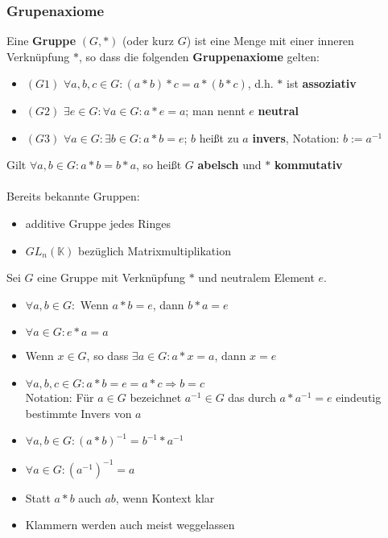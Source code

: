 \documentclass[titlepage]{article}
\newcommand{\K}{\mathbb{K}}
\newcommand{\1}{\mathbb{1}}
\newcommand{\0}{\mathbb{0}}
\begin{document}
				\subsubsection{Grupenaxiome}
					Eine \textbf{Gruppe} $(G,*)$ (oder kurz $G$) ist eine Menge mit einer inneren Verknüpfung $*$, so dass die folgenden \textbf{Gruppenaxiome} gelten:
					\begin{itemize}
						\item $(G1)$ $\forall a,b,c\in G:(a*b)*c=a*(b*c)$, d.h. $*$ ist \textbf{assoziativ}
						\item $(G2)$ $\exists e\in G:\forall a\in G:a*e=a$; man nennt $e$ \textbf{neutral}
						\item $(G3)$ $\forall a\in G:\exists b\in G:a*b=e$; $b$ heißt zu $a$ \textbf{invers}, Notation: $b:=a^{-1}$
					\end{itemize}
					Gilt $\forall a,b\in G:a*b=b*a$, so heißt $G$ \textbf{abelsch} und $*$ \textbf{kommutativ}\\\\
					Bereits bekannte Gruppen:
					\begin{itemize}
						\item additive Gruppe jedes Ringes
						\item $GL_n(\K)$ bezüglich Matrixmultiplikation
					\end{itemize}
				Sei $G$ eine Gruppe mit Verknüpfung $*$ und neutralem Element $e$.
				\begin{itemize}
					\item $\forall a,b\in G:$ Wenn $a*b=e$, dann $b*a=e$
					\item $\forall a\in G:e*a=a$
					\item Wenn $x\in G$, so dass $\exists a\in G:a*x=a$, dann $x=e$
					\item $\forall a,b,c\in G:a*b=e=a*c\Rightarrow b=c$\\
					Notation: Für $a\in G$ bezeichnet $a^{-1}\in G$ das durch $a*a^{-1}=e$ eindeutig bestimmte Invers von $a$
					\item $\forall a,b\in G:(a*b)^{-1}=b^{-1}*a^{-1}$
					\item $\forall a\in G:(a^{-1})^{-1}=a$\\
					\item Statt $a*b$ auch $ab$, wenn Kontext klar
					\item Klammern werden auch meist weggelassen
				\end{itemize}
\end{document}
